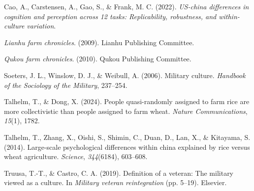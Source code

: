 \documentclass[
  man]{apa6}
\newlength{\cslhangindent}
\newlength{\cslentryspacingunit} %
\newenvironment{CSLReferences}[2] %
 {%
  \setlength{\parindent}{0pt}
  \ifodd #1
  \let\oldpar\par
  \def\par{\hangindent=\cslhangindent\oldpar}
  \fi
  \setlength{\parskip}{#2\cslentryspacingunit}
 }%
 {}
\begin{document}
\hypertarget{refs}{}
\begin{CSLReferences}{1}{0}
\leavevmode{}%
Cao, A., Carstensen, A., Gao, S., \& Frank, M. C. (2022). \emph{US-china differences in cognition and perception across 12 tasks: Replicability, robustness, and within-culture variation}.

\leavevmode{}%
\emph{Lianhu farm chronicles}. (2009). Lianhu Publishing Committee.

\leavevmode{}%
\emph{Qukou farm chronicles}. (2010). Qukou Publishing Committee.

\leavevmode{}%
Soeters, J. L., Winslow, D. J., \& Weibull, A. (2006). Military culture. \emph{Handbook of the Sociology of the Military}, 237--254.

\leavevmode{}%
Talhelm, T., \& Dong, X. (2024). People quasi-randomly assigned to farm rice are more collectivistic than people assigned to farm wheat. \emph{Nature Communications}, \emph{15}(1), 1782.

\leavevmode{}%
Talhelm, T., Zhang, X., Oishi, S., Shimin, C., Duan, D., Lan, X., \& Kitayama, S. (2014). Large-scale psychological differences within china explained by rice versus wheat agriculture. \emph{Science}, \emph{344}(6184), 603--608.

\leavevmode{}%
Truusa, T.-T., \& Castro, C. A. (2019). Definition of a veteran: The military viewed as a culture. In \emph{Military veteran reintegration} (pp. 5--19). Elsevier.

\end{CSLReferences}
\end{document}
